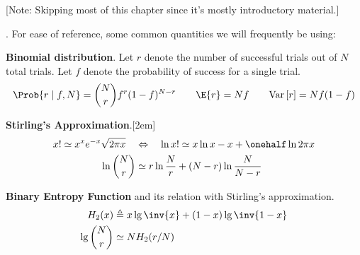 \documentclass[11pt]{article}
\newcommand\p{\Needspace{10\baselineskip} \noindent}
\newcommand\Var[1]{\mathrm{Var}\left[#1\right]}
\begin{document}
\renewcommand{\Z}{\mathbb{Z}}
\label{Information Theory, Inference, and Learning Algorithms}



{\footnotesize [Note: Skipping most of this chapter since it's mostly introductory material.]}

\p {}. For ease of reference, some common quantities we will frequently be using: 
\begin{compactitem}
	\item \textbf{Binomial distribution}. Let $r$ denote the number of successful trials out of $N$ total trials. Let $f$ denote the probability of success for a single trial.
	\begin{align}
	\Prob{r \mid f, N} = \binom{N}{r} f^r (1 - f)^{N - r} \qquad
	\E{r} = Nf \qquad
	\Var{r} = Nf(1-f)
	\end{align}
	
	\item \textbf{Stirling's Approximation}.[2em]
	\begin{align}
	x! \simeq x^x e^{-x} \sqrt{2 \pi x} 
	\quad &\Leftrightarrow \quad
	\ln x! \simeq x \ln x - x + \onehalf \ln 2 \pi x \\
	\ln\binom{N}{r} &\simeq r \ln \frac{N}{r} + (N - r) \ln \frac{N}{N - r}
	\end{align}
	
	\item \textbf{Binary Entropy Function} and its relation with Stirling's approximation.
	\begin{align}
	H_2(x) &\triangleq x \lg \inv{x} + (1-x) \lg \inv{1 - x} \\
	\lg \binom{N}{r} &\simeq N H_2(r/N)
	\end{align}
\end{compactitem}
\end{document}

